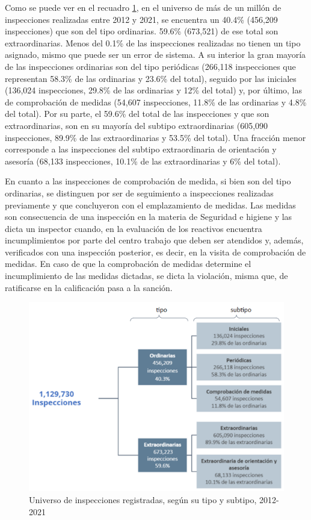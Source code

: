 \documentclass[
]{article}
\begin{document}
Como se puede ver en el recuadro \ref{fig:tipossubtipos}, en el universo de más de un millón de inspecciones realizadas entre 2012 y 2021, se encuentra un 40.4\% (456,209 inspecciones) que son del tipo ordinarias. 59.6\% (673,521) de ese total son extraordinarias. Menos del 0.1\% de las inspecciones realizadas no tienen un tipo asignado, mismo que puede ser un error de sistema. A su interior la gran mayoría de las inspecciones ordinarias son del tipo periódicas (266,118 inspecciones que representan 58.3\% de las ordinarias y 23.6\% del total), seguido por las iniciales (136,024 inspecciones, 29.8\% de las ordinarias y 12\% del total) y, por último, las de comprobación de medidas (54,607 inspecciones, 11.8\% de las ordinarias y 4.8\% del total). Por su parte, el 59.6\% del total de las inspecciones y que son extraordinarias, son en su mayoría del subtipo extraordinarias (605,090 inspecciones, 89.9\% de las extraordinarias y 53.5\% del total). Una fracción menor corresponde a las inspecciones del subtipo extraordinaria de orientación y asesoría (68,133 inspecciones, 10.1\% de las extraordinarias y 6\% del total).

En cuanto a las inspecciones de comprobación de medida, si bien son del tipo ordinarias, se distinguen por ser de seguimiento a inspecciones realizadas previamente y que concluyeron con el emplazamiento de medidas. Las medidas son consecuencia de una inspección en la materia de Seguridad e higiene y las dicta un inspector cuando, en la evaluación de los reactivos encuentra incumplimientos por parte del centro trabajo que deben ser atendidos y, además, verificados con una inspección posterior, es decir, en la visita de comprobación de medidas. En caso de que la comprobación de medidas determine el incumplimiento de las medidas dictadas, se dicta la violación, misma que, de ratificarse en la calificación pasa a la sanción.

\begin{figure}
\includegraphics[width=7.46in]{images-1/08/tipossubtipos} \caption{Universo de inspecciones registradas, según su tipo y subtipo, 2012-2021}\label{fig:tipossubtipos}
\end{figure}
\end{document}
